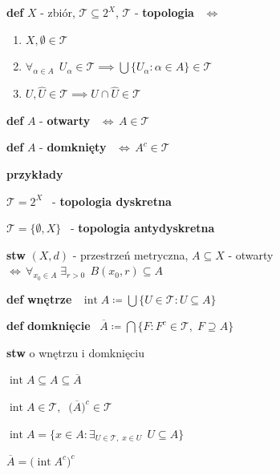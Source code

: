 \documentclass[a4paper,12pt]{article}
\begin{document}

\bigskip
{}

\bigskip
{}

\bigskip
\textbf{def} \; \(X\) - zbiór, \; \(\mathcal{T} \subseteq 2^X\), \; \(\mathcal{T}\) - \textbf{topologia} \, \(\iff\)
\begin{enumerate}[label=\roman*), leftmargin=1.9em, itemsep=0.2em, topsep=0.2em, parsep=0pt, partopsep=0pt]
    \item \(X, \emptyset \in \mathcal{T}\)
    \item \(\forall_{\alpha \in A} \;\, U_\alpha \in \mathcal{T} \implies \displaystyle\bigcup \{U_\alpha : \alpha \in A\} \in \mathcal{T}\)
    \item \(U, \hat{U} \in \mathcal{T} \implies U \cap \hat{U} \in \mathcal{T}\)
\end{enumerate}

\bigskip
\textbf{def} \; \(A\) - \textbf{otwarty} \, \(\iff \, A \in \mathcal{T}\)

\smallskip
\textbf{def} \; \(A\) - \textbf{domknięty} \, \(\iff \, A^c \in \mathcal{T}\)

\bigskip
\begin{logbox}
\textbf{przykłady}
\smallskip
\begin{steps}
    \item \(\mathcal{T} = 2^X\) \, - \textbf{topologia dyskretna}
    \item \(\mathcal{T} = \{\emptyset, X\}\) \, - \textbf{topologia antydyskretna}
\end{steps}
\end{logbox}

\bigskip
\textbf{stw} \; \((X, d)\) - przestrzeń metryczna, \; \(A \subseteq X\) - otwarty \, \(\iff \, \forall_{x_0 \in A} \; \exists_{r > 0} \;\, B(x_0, r) \subseteq A\)

\bigskip
\textbf{def} \; \textbf{wnętrze} \, \(\operatorname{int} A \coloneqq \displaystyle\bigcup \{U \in \mathcal{T} : U \subseteq A\}\)

\smallskip
\textbf{def} \; \textbf{domknięcie} \, \(\overline{A} \coloneqq \displaystyle\bigcap \{F : F^c \in \mathcal{T}, \; F \supseteq A\}\)

\bigskip
\textbf{stw} \; o wnętrzu i domknięciu
\begin{podpunkty}
    \item \(\operatorname{int} A \subseteq A \subseteq \overline{A}\)
    \item \(\operatorname{int} A \in \mathcal{T}, \;\; \big(\overline{A}\big)^c \in \mathcal{T}\)
    \item \(\operatorname{int} A = \{x \in A : \exists_{U \in \mathcal{T}, \; x \in U} \;\, U \subseteq A\}\)
    \item \(\overline{A} = \big(\operatorname{int} A^c\big)^c\)
\end{podpunkty}
\end{document}
